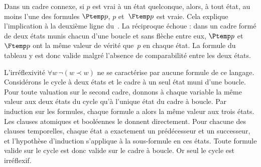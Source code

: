 \documentclass[../../../include/open-logic-section]{subfiles}
\begin{document}
Dans un cadre connexe, si $p$ est vrai à un état quelconque,
alors, à tout état, au moins l'une des formules $\Ptemp p$, $p$
et~$\Ftemp p$ est vraie. Cela explique l'implication à la deuxième
ligne du~. La réciproque échoue : dans
un cadre formé de deux états munis chacun d'une boucle et sans
flèche entre eux, $\Ptemp p$ et $\Ftemp p$ ont la même valeur de
vérité que~$p$ en chaque état. La formule du tableau y est donc
valide malgré l'absence de comparabilité entre les deux états.

L'irréflexivité $\forall w\,\lnot(w\prec w)$ ne se caractérise
par aucune formule de ce langage. Considérons le cycle à deux
états et le cadre à un seul état muni d'une boucle. Pour toute
valuation sur le second cadre, donnons à chaque variable la même
valeur aux deux états du cycle qu'à l'unique état du cadre à
boucle. Par induction sur les formules, chaque formule a alors
la même valeur aux trois états. Les clauses atomiques et
booléennes le donnent directement. Pour chacune des clauses
temporelles, chaque état a exactement un prédécesseur et un
successeur, et l'hypothèse d'induction s'applique à la sous-formule
en ces états. Toute formule valide sur le cycle est donc valide
sur le cadre à boucle. Or seul le cycle est irréflexif.
\end{document}
